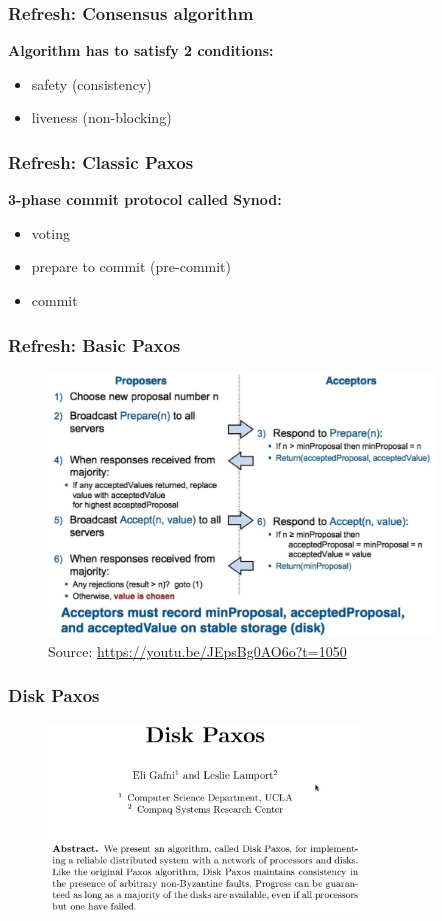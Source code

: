 \documentclass[10pt,utf8]{beamer}
\begin{document}
\begin{frame}
    \frametitle{Refresh: Consensus algorithm}
    \centering
    \textbf{Algorithm has to satisfy 2 conditions:}
    \vspace{0.5cm}
    \begin{itemize}
     \item safety (consistency)
     \item liveness (non-blocking)
    \end{itemize}
\end{frame}

\begin{frame}
    \frametitle{Refresh: Classic Paxos}
    \centering
    \textbf{3-phase commit protocol called Synod:}
    \vspace{0.5cm}
    \begin{itemize}
     \item voting
     \item prepare to commit (pre-commit)
     \item commit
    \end{itemize}
\end{frame}

\begin{frame}
    \frametitle{Refresh: Basic Paxos}
    \begin{figure}
        \centering
        \includegraphics[height=7cm]{./img/basic-paxos.eps}
        \caption{\tiny{Source: \url{https://youtu.be/JEpsBg0AO6o?t=1050}}}
    \end{figure}
\end{frame}

\begin{frame}
    \frametitle{Disk Paxos}
    \begin{figure}
        \centering
        \includegraphics[height=5cm]{./img/disk-paxos-paper.eps}
    \end{figure}
\end{frame}
\end{document}

